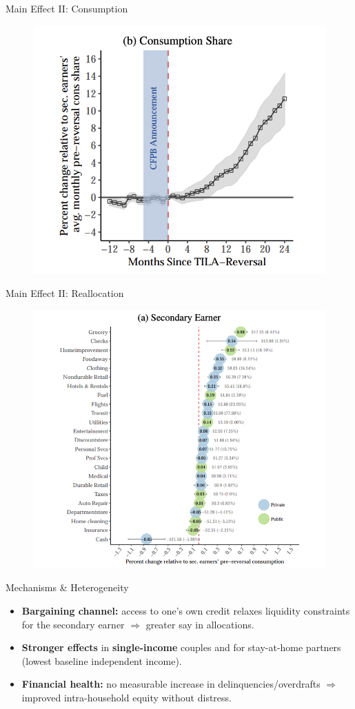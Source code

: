 \documentclass[11pt,notes=hide,aspectratio=169,mathserif]{beamer}
\begin{document}
\begin{frame}{Main Effect II: Consumption}
\begin{figure}
\centering
\includegraphics[width=0.5\linewidth]{inputs/paper3fig2.png}
\end{figure}
\end{frame}

\begin{frame}{Main Effect II: Reallocation}
\begin{figure}
\centering
\includegraphics[width=0.5\linewidth]{inputs/paper3fig3.png}
\end{figure}
\end{frame}

\begin{frame}{Mechanisms \& Heterogeneity}
\small
\begin{itemize}
  \item \textbf{Bargaining channel:} access to one’s own credit relaxes liquidity constraints for the secondary earner \(\Rightarrow\) greater say in allocations.
  \item \textbf{Stronger effects} in \textbf{single-income} couples and for stay-at-home partners (lowest baseline independent income).
  \item \textbf{Financial health:} no measurable increase in delinquencies/overdrafts \(\Rightarrow\) improved intra-household equity without distress.
\end{itemize}
\end{frame}
\end{document}
